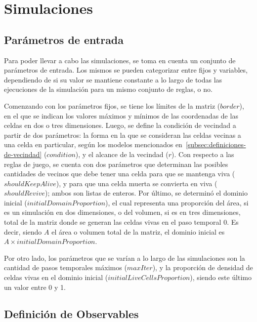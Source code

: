 \section{Simulaciones}\label{sec:simulaciones}

\subsection{Parámetros de entrada}\label{subsec:parametros-de-entrada}

Para poder llevar a cabo las simulaciones, se toma en cuenta un conjunto de parámetros de entrada.
Los mismos se pueden categorizar entre fijos y variables, dependiendo de si su valor se mantiene
constante a lo largo de todas las ejecuciones de la simulación para un mismo conjunto de reglas, o no.

Comenzando con los parámetros fijos, se tiene los límites de la matriz ($border$),
en el que se indican los valores máximos y mínimos de las coordenadas de las celdas en dos o tres dimensiones.
Luego, se define la condición de vecindad a partir de dos parámetros:
la forma en la que se consideran las celdas vecinas a una celda en particular, según los modelos mencionados
en~\ref{subsec:definiciones-de-vecindad} ($condition$), y el alcance de la vecindad ($r$).
Con respecto a las reglas de juego, se cuenta con dos parámetros que determinan las posibles cantidades de
vecinos que debe tener una celda para que se mantenga viva ($shouldKeepAlive$),
y para que una celda muerta se convierta en viva ($shouldRevive$); ambos son listas de enteros.
Por último, se determinó el dominio inicial ($initialDomainProportion$), el
cual representa una proporción del área, si es un simulación en dos dimensiones, o del volumen,
si es en tres dimensiones, total de la matriz donde se generan las celdas vivas en el paso temporal 0.
Es decir, siendo $A$ el área o volumen total de la matriz, el dominio inicial es $A \times initialDomainProportion$.

Por otro lado, los parámetros que se varían a lo largo de las simulaciones son la cantidad de pasos temporales
máximos ($maxIter$), y la proporción de densidad de celdas vivas en el dominio inicial ($initialLiveCellsProportion$),
siendo este último un valor entre 0 y 1.


\subsection{Definición de Observables}\label{subsec:observables-posibles}

